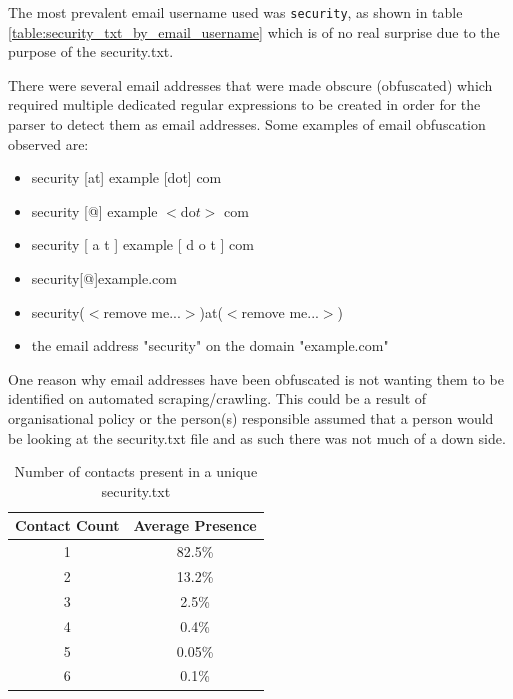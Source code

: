 \documentclass{mscreport}
\begin{document}
\noindent
The most prevalent email username used was \texttt{security}, as shown in table \ref{table:security_txt_by_email_username} which is of no real surprise due to the purpose of the security.txt.

\vspace{0.3cm} \noindent
There were several email addresses that were made obscure (obfuscated) which required multiple dedicated regular expressions to be created in order for the parser to detect them as email addresses. Some examples of email obfuscation observed are:

\begin{itemize}
	\setlength\itemsep{0.01em}
    \item security [at] example [dot] com
    \item security [@] example $<$do$t>$ com
    \item security [ a t ] example [ d o t ] com
    \item security[@]example.com
    \item security($<$remove me...$>$)at($<$remove me...$>$)
    \item the email address "security" on the domain "example.com"
\end{itemize}

\noindent
One reason why email addresses have been obfuscated is not wanting them to be identified on automated scraping/crawling. This could be a result of organisational policy or the person(s) responsible assumed that a person would be looking at the security.txt file and as such there was not much of a down side.

\begin{table}[H]
  \begin{center}
    \begin{tabular}{|c|c|}  %
      \hline
      \textbf{Contact Count} & \textbf{Average Presence}\\
      \hline
      1 & 82.5\%\\
      \hline
      2 & 13.2\%\\
      \hline
      3 & 2.5\%\\
      \hline
      4 & 0.4\%\\
      \hline
      5 & 0.05\%\\
      \hline
      6 & 0.1\%\\
      \hline
    \end{tabular}
    \caption{Number of contacts present in a unique security.txt}
    \label{table:security_txt_by_contact_count} %
  \end{center}
\end{table}
\end{document}
